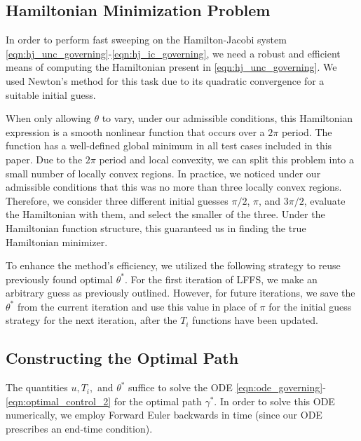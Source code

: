 \documentclass[pdflatex,sn-mathphys-num]{sn-jnl}%
\theoremstyle{thmstyleone}%
\theoremstyle{thmstyletwo}%
\theoremstyle{thmstylethree}%
\begin{document}
\subsection{Hamiltonian Minimization Problem}
\label{sec:Ham_min}
In order to perform fast sweeping on the Hamilton-Jacobi system \eqref{eqn:hj_unc_governing}-\eqref{eqn:hj_ic_governing}, we need a robust and efficient means of computing the Hamiltonian present in \eqref{eqn:hj_unc_governing}.  We used Newton's method for this task due to its quadratic convergence for a suitable initial guess.  


When only allowing $\theta$ to vary, under our admissible conditions, this Hamiltonian expression is a smooth nonlinear function that occurs over a $2 \pi$ period.  The function has a well-defined global minimum in all test cases included in this paper.  Due to the $2 \pi$ period and local convexity, we can split this problem into a small number of locally convex regions.  In practice, we noticed under our admissible conditions that this was no more than three locally convex regions.  Therefore, we consider three different initial guesses $\pi/2$, $\pi$, and $3\pi/2$, evaluate the Hamiltonian with them, and select the smaller of the three.  Under the Hamiltonian function structure, this guaranteed us in finding the true Hamiltonian minimizer.


To enhance the method's efficiency, we utilized the following strategy to reuse previously found optimal $\theta^*$.  For the first iteration of LFFS, we make an arbitrary guess as previously outlined.  However, for future iterations, we save the $\theta^*$ from the current iteration and use this value {\color{violet} in place of $\pi$} for the initial guess strategy for the next iteration, after the $T_i$ functions have been updated.




\subsection{Constructing the Optimal Path}
\label{sec:HJ_path}

The quantities $u, T_i,$ and $\theta^*$ suffice to solve the ODE \eqref{eqn:ode_governing}-   \eqref{eqn:optimal_control_2} for the optimal path $\gamma^*$.  In order to solve this ODE numerically, we employ Forward Euler backwards in time (since our ODE prescribes an end-time condition).  
\end{document}
